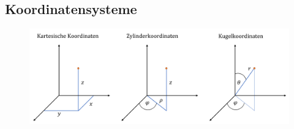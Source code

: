 \documentclass[a4paper]{article}
\begin{document}
\newpage
\subsection{Koordinatensysteme}

\begin{figure}[h]
	\centering
	\includegraphics[width=13cm,keepaspectratio]{"Bilder/Koordinatensysteme"}
	\label{pic:Koordinatensysteme}
\end{figure}
\end{document}
